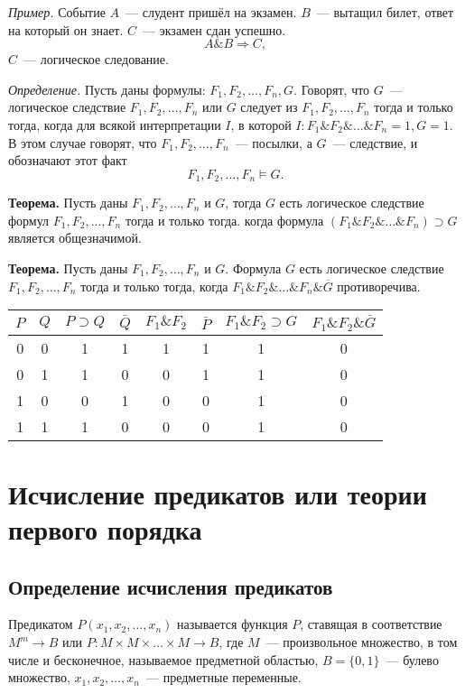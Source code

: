 \documentclass[a4paper,12pt]{report}
\begin{document}
	\textit{Пример.} Событие $ A $~--- слудент пришёл на экзамен. $ B $~---
	вытащил билет, ответ на который он знает. $ C $~--- экзамен сдан успешно.
	$$ A \& B \Rightarrow C, $$
	$ C $~--- логическое следование.

	\textit{Определение.} Пусть даны формулы: $ F_1, F_2, \dots, F_n, G $.
	Говорят, что $ G$~--- логическое следствие $ F_1, F_2, \dots, F_n $ или $ G $
	следует из $ F_1, F_2, \dots, F_n $ тогда и только тогда, когда для всякой
	интерпретации $ I $, в которой $ I: F_1 \& F_2 \& \dots \& F_n = 1, G = 1. $
	В этом случае говорят, что $ F_1, F_2, \dots, F_n $~--- посылки, а $ G $~---
	следствие, и обозначают этот факт
	$$ F_1, F_2, \dots, F_n \models G. $$

	\textbf{Теорема.} Пусть даны $ F_1, F_2, \dots, F_n $ и $ G $, тогда $ G $
	есть логическое следствие формул $ F_1, F_2, \dots, F_n $ тогда и только
	тогда. когда формула $ (F_1 \& F_2 \& \dots \& F_n) \supset G $ является
	общезначимой.

	\textbf{Теорема.} Пусть даны $ F_1, F_2, \dots, F_n $ и $ G $. Формула $ G $
	есть логическое следствие $ F_1, F_2, \dots, F_n $ тогда и только тогда,
	когда $ F_1 \& F_2 \& \dots \& F_n \& \overline{G} $ противоречива.
	\begin{center}
		\begin{tabular}{ | c | c || c | c | c | c | c | c | }
			\hline
			$P$ & $Q$ & $P \supset Q$ & $\bar{Q}$ & $F_1 \& F_2$ & $\bar{P}$ &
			$F_1 \& F_2 \supset G$ & $F_1 \& F_2 \& \bar{G}$ \\
			\hline \hline
			0 & 0 & 1 & 1 & 1 & 1 & 1 & 0 \\
			\hline
			0 & 1 & 1 & 0 & 0 & 1 & 1 & 0 \\
			\hline
			1 & 0 & 0 & 1 & 0 & 0 & 1 & 0 \\
			\hline
			1 & 1 & 1 & 0 & 0 & 0 & 1 & 0 \\
			\hline
		\end{tabular}
	\end{center}


\section{Исчисление предикатов или теории первого порядка}


\subsection{Определение исчисления предикатов}
	Предикатом $P(x_1, x_2, \dots, x_n)$ называется функция $ P $, ставящая в
	соответствие $M^m \rightarrow B$ или $P: M \times M \times \dots \times M
	\rightarrow B $, где $M$~--- произвольное множество, в том числе и
	бесконечное, называемое предметной областью, $B=\{0,1\}$~--- булево
	множество, $x_1, x_2, \dots, x_n$~--- предметные переменные.
\end{document}
